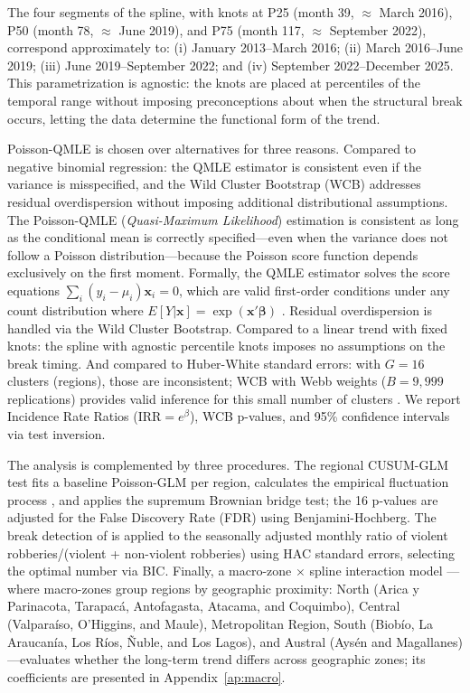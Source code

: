 \documentclass[pdflatex,sn-basic]{sn-jnl}
\begin{document}
The four segments of the spline, with knots at P25 (month 39, $\approx$ March 2016),
P50 (month 78, $\approx$ June 2019), and P75 (month 117, $\approx$ September 2022),
correspond approximately to: (i) January 2013--March 2016; (ii) March 2016--June 2019;
(iii) June 2019--September 2022; and (iv) September 2022--December 2025. This parametrization is agnostic: the knots are placed
at percentiles of the temporal range without imposing preconceptions about when the
structural break occurs, letting the data determine the functional form of the trend.

Poisson-QMLE is chosen over alternatives for three reasons. Compared to negative binomial
regression: the QMLE estimator is consistent even if the variance is misspecified,
and the Wild Cluster Bootstrap (WCB) addresses residual overdispersion
without imposing additional distributional assumptions. The Poisson-QMLE (\textit{Quasi-Maximum Likelihood}) estimation is consistent as long as the conditional mean is correctly specified---even when the variance does not follow a Poisson distribution---because the Poisson score function depends exclusively on the first moment. Formally, the QMLE estimator solves the score equations $\sum_{i}(y_i - \mu_i)\mathbf{x}_i = 0$, which are valid first-order conditions under any count distribution where $E[Y|\mathbf{x}] = \exp(\mathbf{x}'\boldsymbol{\beta})$ \citep{gourieroux1984,wooldridge2010}. Residual overdispersion is handled via the Wild Cluster Bootstrap. Compared to a linear trend
with fixed knots: the spline with agnostic percentile knots imposes
no assumptions on the break timing. And compared to Huber-White standard errors:
with $G=16$ clusters (regions), those are inconsistent; WCB with
Webb weights ($B=9,999$ replications) provides valid inference for this small
number of clusters \citep{cameron2015,mackinnon2023}. We report Incidence Rate
Ratios ($\text{IRR} = e^\beta$), WCB p-values, and 95\% confidence intervals via test inversion.

The analysis is complemented by three procedures. The regional CUSUM-GLM test
fits a baseline Poisson-GLM per region, calculates the empirical fluctuation process
\citep{zeileis2002}, and applies the supremum Brownian bridge test; the 16 p-values are
adjusted for the False Discovery Rate (FDR) using Benjamini-Hochberg. The
break detection of \citet{bai1998} is applied to the seasonally adjusted monthly ratio
of violent robberies/(violent + non-violent robberies) using HAC standard errors, selecting the optimal
number via BIC. Finally, a macro-zone $\times$ spline interaction model
---where macro-zones group regions by geographic proximity: North (Arica y Parinacota, Tarapac\'a, Antofagasta, Atacama, and Coquimbo), Central (Valpara\'iso, O'Higgins, and Maule), Metropolitan Region, South (Biob\'io, La Araucan\'ia, Los R\'ios, \~Nuble, and Los Lagos), and Austral (Ays\'en and Magallanes)---evaluates whether the long-term trend differs across geographic
zones; its coefficients are presented in Appendix~\ref{ap:macro}.
\end{document}
